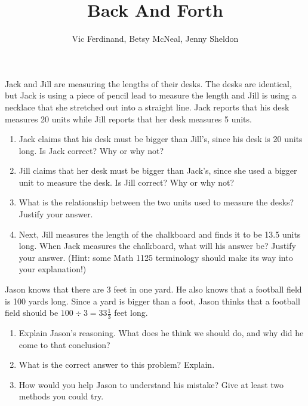 \documentclass[nooutcomes]{ximera}
\title{Back And Forth}
\author{Vic Ferdinand, Betsy McNeal, Jenny Sheldon}
\begin{document}
\begin{abstract}\end{abstract}
\maketitle




\begin{problem} \label{BackAndForth1}
    Jack and Jill are measuring the lengths of their desks.  The desks are identical, but Jack is using a piece of pencil lead to measure the length and Jill is using a necklace that she stretched out into a straight line.  Jack reports that his desk measures 20 units while Jill reports that her desk measures 5 units.
    \begin{enumerate}
        \item Jack claims that his desk must be bigger than Jill's, since his desk is 20 units long.  Is Jack correct?  Why or why not?
        \item Jill claims that her desk must be bigger than Jack's, since she used a bigger unit to measure the desk.  Is Jill correct?  Why or why not?
        \item What is the relationship between the two units used to measure the desks?  Justify your answer.
        \item Next, Jill measures the length of the chalkboard and finds it to be 13.5 units long.  When Jack measures the chalkboard, what will his answer be?  Justify your answer.  (Hint: some Math 1125 terminology should make its way into your explanation!)
    \end{enumerate}
    

\end{problem}

\begin{problem} \label{BackAndForth2}
    Jason knows that there are 3 feet in one yard.  He also knows that a football field is 100 yards long.  Since a yard is bigger than a foot, Jason thinks that a football field should be $100 \div 3 = 33 \frac{1}{3}$ feet long.
    \begin{enumerate}
    \item Explain Jason's reasoning.  What does he think we should do, and why did he come to that conclusion?
    \item What is the correct answer to this problem? Explain.
    \item How would you help Jason to understand his mistake?  Give at least two methods you could try.
    \end{enumerate}
   
    

\end{problem}
\end{document}
